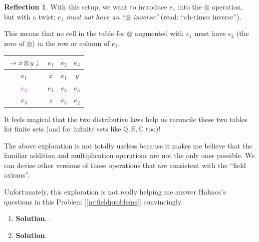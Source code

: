 \documentclass[english,notitlepage,smartquotes]{hgbreport}
\theoremstyle{definition}
\theoremstyle{definition}
\theoremstyle{remark}
\theoremstyle{definition}
\theoremstyle{plain}
\theoremstyle{definition}
\newtheorem{reflection}{Reflection}
\begin{document}
\begin{reflection}
With this setup, we want to introduce $e_1$ into the $\otimes$ operation, but with a twist: \emph{$e_1$ must not have an ``$\otimes$ inverse''} (read: ``oh-times inverse''). 

This means that no cell in the table for $\otimes$ augmented with $e_1$ must have $e_2$ (the zero of $\otimes$) in the row or column of $e_1$.

\begin{tabular}{c|ccc}
\centering
$\rightarrow x\otimes y\downarrow$ & $e_1$ & $e_2$ & $e_3$\\
\hline
$e_1$ & $x$ & $e_1$ & $y$\\
\textcolor{magenta}{$e_2$} & $e_1$ & $e_2$ & $e_3$\\
$e_3$ & $z$ & $e_3$ & $e_2$
\label{tab:introducee1inx}
\end{tabular}

It feels magical that the two distributive laws help us reconcile these two tables for finite sets (and for infinite sets like $\mathbb{Q},\mathbb{R},\mathbb{C}$ too)!




The above exploration is not totally useless because it makes me believe that the familiar addition and multiplication operations are not the only ones possible. We can devise other versions of those operations that are consistent with the ``field axioms''.

Unfortunately, this exploration is not really helping me answer Halmos's questions in this Problem [\ref{pr:fieldproblems}] convincingly.

\end{reflection}


\begin{enumerate}[label=(\emph{\alph*})]
\item

\textbf{Solution}. .
\item

\textbf{Solution}.
\end{enumerate}
\end{document}
